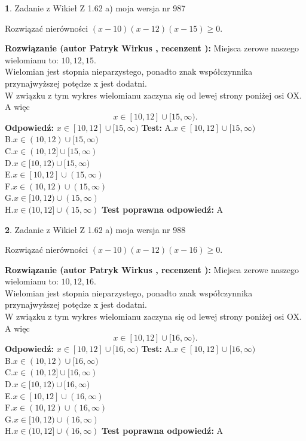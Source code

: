\documentclass[12pt, a4paper]{article}
\theoremstyle{definition} %
\newtheorem{zad}{}
\newcommand{\zadStart}[1]{\begin{zad}#1\newline}
\newcommand{\zadStop}{\end{zad}}
\newcommand{\rozwStart}[2]{\noindent \textbf{Rozwiązanie (autor #1 , recenzent #2): }\newline}
\newcommand{\rozwStop}{\newline}
\newcommand{\odpStart}{\noindent \textbf{Odpowiedź:}\newline}
\newcommand{\odpStop}{\newline}
\newcommand{\testStart}{\noindent \textbf{Test:}\newline}
\newcommand{\testStop}{\newline}
\newcommand{\kluczStart}{\noindent \textbf{Test poprawna odpowiedź:}\newline}
\newcommand{\kluczStop}{\newline}
\begin{document}
\zadStart{Zadanie z Wikieł Z 1.62 a) moja wersja nr 987}

Rozwiązać nierówności $(x-10)(x-12)(x-15)\ge0$.
\zadStop
\rozwStart{Patryk Wirkus}{}
Miejsca zerowe naszego wielomianu to: $10, 12, 15$.\\
Wielomian jest stopnia nieparzystego, ponadto znak współczynnika przy\linebreak najwyższej potędze x jest dodatni.\\ W związku z tym wykres wielomianu zaczyna się od lewej strony poniżej osi OX. A więc $$x \in [10,12] \cup [15,\infty).$$
\rozwStop
\odpStart
$x \in [10,12] \cup [15,\infty)$
\odpStop
\testStart
A.$x \in [10,12] \cup [15,\infty)$\\
B.$x \in (10,12) \cup [15,\infty)$\\
C.$x \in (10,12] \cup [15,\infty)$\\
D.$x \in [10,12) \cup [15,\infty)$\\
E.$x \in [10,12] \cup (15,\infty)$\\
F.$x \in (10,12) \cup (15,\infty)$\\
G.$x \in [10,12) \cup (15,\infty)$\\
H.$x \in (10,12] \cup (15,\infty)$
\testStop
\kluczStart
A
\kluczStop



\zadStart{Zadanie z Wikieł Z 1.62 a) moja wersja nr 988}

Rozwiązać nierówności $(x-10)(x-12)(x-16)\ge0$.
\zadStop
\rozwStart{Patryk Wirkus}{}
Miejsca zerowe naszego wielomianu to: $10, 12, 16$.\\
Wielomian jest stopnia nieparzystego, ponadto znak współczynnika przy\linebreak najwyższej potędze x jest dodatni.\\ W związku z tym wykres wielomianu zaczyna się od lewej strony poniżej osi OX. A więc $$x \in [10,12] \cup [16,\infty).$$
\rozwStop
\odpStart
$x \in [10,12] \cup [16,\infty)$
\odpStop
\testStart
A.$x \in [10,12] \cup [16,\infty)$\\
B.$x \in (10,12) \cup [16,\infty)$\\
C.$x \in (10,12] \cup [16,\infty)$\\
D.$x \in [10,12) \cup [16,\infty)$\\
E.$x \in [10,12] \cup (16,\infty)$\\
F.$x \in (10,12) \cup (16,\infty)$\\
G.$x \in [10,12) \cup (16,\infty)$\\
H.$x \in (10,12] \cup (16,\infty)$
\testStop
\kluczStart
A
\kluczStop
\end{document}
